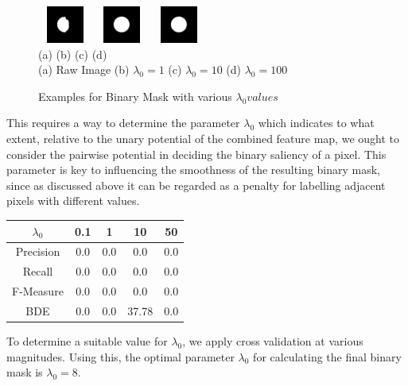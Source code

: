 \documentclass[10pt,twocolumn,letterpaper]{article}
\newcommand{\hs}{\hspace{0.58in}}
\begin{document}
\begin{figure}[t]
\begin{center}
    \includegraphics[width=0.7in,height=0.48in]{./Figures/Lambda/5_154_154732_2.jpg}
    \includegraphics[width=0.7in,height=0.48in]{./Figures/Lambda/5_154_154732_3.jpg} 
    \includegraphics[width=0.7in,height=0.48in]{./Figures/Lambda/5_154_154732_4.jpg} \\
    \footnotesize \hspace{0.1cm} (a) \hs (b) \hs  (c) \hs (d) \\
    \footnotesize  (a) Raw Image (b) $\lambda_0 = 1$  (c) $\lambda_0 = 10$ (d) $\lambda_0 =100$ \\
     \caption{Examples for Binary Mask with various $\lambda_0 values$}
\end{center}
\end{figure}


This requires a way to determine the parameter $\lambda_0$ which indicates to what extent, relative to the unary potential of the combined feature map, we ought to consider the pairwise potential in deciding the binary saliency of a pixel.  This parameter is key to influencing the smoothness of the resulting binary mask, since as discussed above it can be regarded as a penalty for labelling adjacent pixels with different values.

\begin{center}
\begin{tabular}{|c|c|c|c|c|}
    \hline
    $\lambda_0$ & 0.1 & 1   & 10 & 50 \\ \hline
    Precision   & 0.0 & 0.0 & 0.0 & 0.0 \\
    Recall      & 0.0 & 0.0 & 0.0 & 0.0 \\
    F-Measure   & 0.0 & 0.0 & 0.0 & 0.0 \\
    BDE & 0.0   & 0.0 & 37.78 &0.0 \\ \hline
\end{tabular}
\end{center}

To determine a suitable value for $\lambda_0$, we apply cross validation at various magnitudes.  Using this, the optimal parameter $\lambda_0$ for calculating the final binary mask is $\lambda_0 = 8$.
\end{document}
